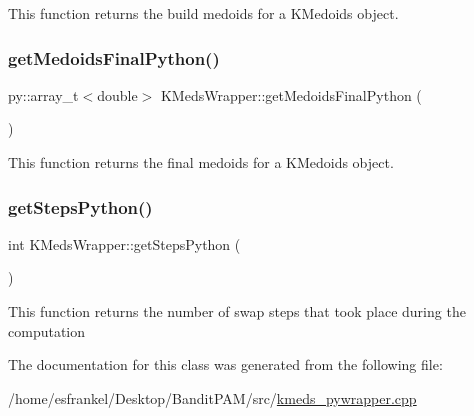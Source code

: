 This function returns the build medoids for a K\+Medoids object. \mbox{\label{classKMedsWrapper_ae825241c43b8bf92912eb59cd12ae1c5}} 
\subsubsection{\texorpdfstring{get\+Medoids\+Final\+Python()}{getMedoidsFinalPython()}}
{\footnotesize\ttfamily py\+::array\+\_\+t$<$double$>$ K\+Meds\+Wrapper\+::get\+Medoids\+Final\+Python (\begin{DoxyParamCaption}{ }\end{DoxyParamCaption})\hspace{0.3cm}{\ttfamily [inline]}}

This function returns the final medoids for a K\+Medoids object. \mbox{\label{classKMedsWrapper_a25ac2830354eeae7963cdec34d0137e8}} 
\subsubsection{\texorpdfstring{get\+Steps\+Python()}{getStepsPython()}}
{\footnotesize\ttfamily int K\+Meds\+Wrapper\+::get\+Steps\+Python (\begin{DoxyParamCaption}{ }\end{DoxyParamCaption})\hspace{0.3cm}{\ttfamily [inline]}}

This function returns the number of swap steps that took place during the computation 

The documentation for this class was generated from the following file\+:\begin{DoxyCompactItemize}
\item 
/home/esfrankel/\+Desktop/\+Bandit\+P\+A\+M/src/\hyperlink{kmeds__pywrapper_8cpp}{kmeds\+\_\+pywrapper.\+cpp}\end{DoxyCompactItemize}
